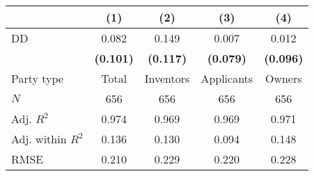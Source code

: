 
\begin{tabular}[t]{lcccc}
\toprule
  & (1) & (2) & (3) & (4)\\
\midrule
DD & \num{0.082} & \num{0.149} & \num{0.007} & \num{0.012}\\
\textbf{} & \textbf{(\num{0.101})} & \textbf{(\num{0.117})} & \textbf{(\num{0.079})} & \textbf{(\num{0.096})}\\
\midrule
Party type & Total & Inventors & Applicants & Owners\\
$N$ & \num{656} & \num{656} & \num{656} & \num{656}\\
Adj. $R^2$ & \num{0.974} & \num{0.969} & \num{0.969} & \num{0.971}\\
Adj. within $R^2$ & \num{0.136} & \num{0.130} & \num{0.094} & \num{0.148}\\
RMSE & \num{0.210} & \num{0.229} & \num{0.220} & \num{0.228}\\
\bottomrule
\end{tabular}
